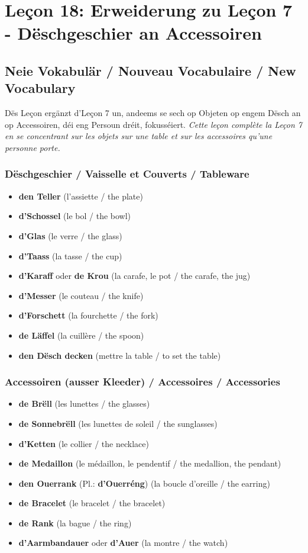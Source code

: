 \chapter{Leçon 18: Erweiderung zu Leçon 7 - Dëschgeschier an Accessoiren}

\section{Neie Vokabulär / Nouveau Vocabulaire / New Vocabulary}

Dës Leçon ergänzt d'Leçon 7 un, andeems se sech op Objeten op engem Dësch an op Accessoiren, déi eng Persoun dréit, fokusséiert. \textit{Cette leçon complète la Leçon 7 en se concentrant sur les objets sur une table et sur les accessoires qu'une personne porte.}

\subsection{Dëschgeschier / Vaisselle et Couverts / Tableware}
\begin{itemize}
    \item \textbf{den Teller} (l'assiette / the plate)
    \item \textbf{d'Schossel} (le bol / the bowl)
    \item \textbf{d'Glas} (le verre / the glass)
    \item \textbf{d'Taass} (la tasse / the cup)
    \item \textbf{d'Karaff} oder \textbf{de Krou} (la carafe, le pot / the carafe, the jug)
    \item \textbf{d'Messer} (le couteau / the knife)
    \item \textbf{d'Forschett} (la fourchette / the fork)
    \item \textbf{de Läffel} (la cuillère / the spoon)
    \item \textbf{den Dësch decken} (mettre la table / to set the table)
\end{itemize}

\subsection{Accessoiren (ausser Kleeder) / Accessoires / Accessories}
\begin{itemize}
    \item \textbf{de Brëll} (les lunettes / the glasses)
    \item \textbf{de Sonnebrëll} (les lunettes de soleil / the sunglasses)
    \item \textbf{d'Ketten} (le collier / the necklace)
    \item \textbf{de Medaillon} (le médaillon, le pendentif / the medallion, the pendant)
    \item \textbf{den Ouerrank} (Pl.: \textbf{d'Ouerréng}) (la boucle d'oreille / the earring)
    \item \textbf{de Bracelet} (le bracelet / the bracelet)
    \item \textbf{de Rank} (la bague / the ring)
    \item \textbf{d'Aarmbandauer} oder \textbf{d'Auer} (la montre / the watch)
\end{itemize}

